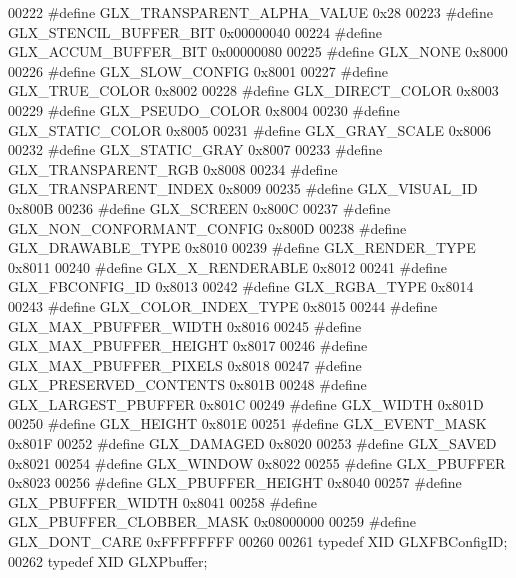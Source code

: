 \begin{DoxyCode}
00222 \textcolor{preprocessor}{#define GLX\_TRANSPARENT\_ALPHA\_VALUE 0x28}
00223 \textcolor{preprocessor}{#define GLX\_STENCIL\_BUFFER\_BIT 0x00000040}
00224 \textcolor{preprocessor}{#define GLX\_ACCUM\_BUFFER\_BIT 0x00000080}
00225 \textcolor{preprocessor}{#define GLX\_NONE 0x8000}
00226 \textcolor{preprocessor}{#define GLX\_SLOW\_CONFIG 0x8001}
00227 \textcolor{preprocessor}{#define GLX\_TRUE\_COLOR 0x8002}
00228 \textcolor{preprocessor}{#define GLX\_DIRECT\_COLOR 0x8003}
00229 \textcolor{preprocessor}{#define GLX\_PSEUDO\_COLOR 0x8004}
00230 \textcolor{preprocessor}{#define GLX\_STATIC\_COLOR 0x8005}
00231 \textcolor{preprocessor}{#define GLX\_GRAY\_SCALE 0x8006}
00232 \textcolor{preprocessor}{#define GLX\_STATIC\_GRAY 0x8007}
00233 \textcolor{preprocessor}{#define GLX\_TRANSPARENT\_RGB 0x8008}
00234 \textcolor{preprocessor}{#define GLX\_TRANSPARENT\_INDEX 0x8009}
00235 \textcolor{preprocessor}{#define GLX\_VISUAL\_ID 0x800B}
00236 \textcolor{preprocessor}{#define GLX\_SCREEN 0x800C}
00237 \textcolor{preprocessor}{#define GLX\_NON\_CONFORMANT\_CONFIG 0x800D}
00238 \textcolor{preprocessor}{#define GLX\_DRAWABLE\_TYPE 0x8010}
00239 \textcolor{preprocessor}{#define GLX\_RENDER\_TYPE 0x8011}
00240 \textcolor{preprocessor}{#define GLX\_X\_RENDERABLE 0x8012}
00241 \textcolor{preprocessor}{#define GLX\_FBCONFIG\_ID 0x8013}
00242 \textcolor{preprocessor}{#define GLX\_RGBA\_TYPE 0x8014}
00243 \textcolor{preprocessor}{#define GLX\_COLOR\_INDEX\_TYPE 0x8015}
00244 \textcolor{preprocessor}{#define GLX\_MAX\_PBUFFER\_WIDTH 0x8016}
00245 \textcolor{preprocessor}{#define GLX\_MAX\_PBUFFER\_HEIGHT 0x8017}
00246 \textcolor{preprocessor}{#define GLX\_MAX\_PBUFFER\_PIXELS 0x8018}
00247 \textcolor{preprocessor}{#define GLX\_PRESERVED\_CONTENTS 0x801B}
00248 \textcolor{preprocessor}{#define GLX\_LARGEST\_PBUFFER 0x801C}
00249 \textcolor{preprocessor}{#define GLX\_WIDTH 0x801D}
00250 \textcolor{preprocessor}{#define GLX\_HEIGHT 0x801E}
00251 \textcolor{preprocessor}{#define GLX\_EVENT\_MASK 0x801F}
00252 \textcolor{preprocessor}{#define GLX\_DAMAGED 0x8020}
00253 \textcolor{preprocessor}{#define GLX\_SAVED 0x8021}
00254 \textcolor{preprocessor}{#define GLX\_WINDOW 0x8022}
00255 \textcolor{preprocessor}{#define GLX\_PBUFFER 0x8023}
00256 \textcolor{preprocessor}{#define GLX\_PBUFFER\_HEIGHT 0x8040}
00257 \textcolor{preprocessor}{#define GLX\_PBUFFER\_WIDTH 0x8041}
00258 \textcolor{preprocessor}{#define GLX\_PBUFFER\_CLOBBER\_MASK 0x08000000}
00259 \textcolor{preprocessor}{#define GLX\_DONT\_CARE 0xFFFFFFFF}
00260 
00261 \textcolor{keyword}{typedef} XID GLXFBConfigID;
00262 \textcolor{keyword}{typedef} XID GLXPbuffer;

\end{DoxyCode}
